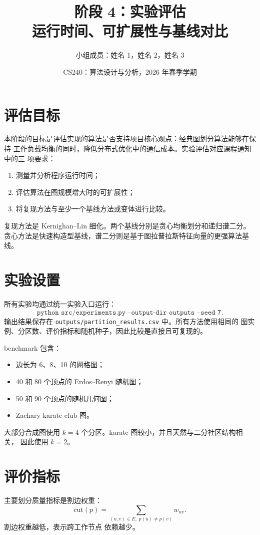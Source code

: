 \documentclass[UTF8, 11pt]{ctexart}
\title{\textbf{阶段 4：实验评估}\\
运行时间、可扩展性与基线对比}
\author{小组成员：姓名 1，姓名 2，姓名 3}
\date{CS240：算法设计与分析，2026 年春季学期}
\begin{document}
\maketitle

\section{评估目标}

本阶段的目标是评估实现的算法是否支持项目核心观点：经典图划分算法能够在保持
工作负载均衡的同时，降低分布式优化中的通信成本。实验评估对应课程通知中的三
项要求：
\begin{enumerate}
    \item 测量并分析程序运行时间；
    \item 评估算法在图规模增大时的可扩展性；
    \item 将复现方法与至少一个基线方法或变体进行比较。
\end{enumerate}

复现方法是 Kernighan--Lin 细化。两个基线分别是贪心均衡划分和递归谱二分。
贪心方法是快速构造型基线，谱二分则是基于图拉普拉斯特征向量的更强算法基线。

\section{实验设置}

所有实验均通过统一实验入口运行：
\[
\texttt{python src/experiments.py --output-dir outputs --seed 7}.
\]
输出结果保存在 \texttt{outputs/partition\_results.csv} 中。所有方法使用相同的
图实例、分区数、评价指标和随机种子，因此比较是直接且可复现的。

benchmark 包含：
\begin{itemize}
    \item 边长为 6、8、10 的网格图；
    \item 40 和 80 个顶点的 Erdos--Renyi 随机图；
    \item 50 和 90 个顶点的随机几何图；
    \item Zachary karate club 图。
\end{itemize}

大部分合成图使用 $k=4$ 个分区。karate 图较小，并且天然与二分社区结构相关，
因此使用 $k=2$。

\section{评价指标}

主要划分质量指标是割边权重：
\[
    \mathrm{cut}(p)
    =
    \sum_{(u,v)\in E,\;p(u)\neq p(v)} w_{uv}.
\]
割边权重越低，表示跨工作节点 依赖越少。
\end{document}
